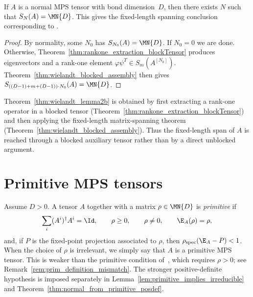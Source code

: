 \begin{theorem}\label{thm:wielandt_lemma2b}
    \leanok
    If $A$ is a normal MPS tensor with bond dimension~$D$,
    then there exists $N$ such that $S_N(A) = \MN{D}$.
    This gives the fixed-length spanning conclusion corresponding to
    \cite[Lemma~2(b)]{Sanz2010Quantum}.
\end{theorem}

\begin{proof}
    \leanok
    By normality, some $N_0$ has $S_{N_0}(A) = \MN{D}$.
    If $N_0 = 0$ we are done.
    Otherwise, Theorem~\ref{thm:rankone_extraction_blockTensor}
    produces eigenvectors and a rank-one element
    $\varphi \psi^T \in S_m(A^{[N_0]})$.
    Theorem~\ref{thm:wielandt_blocked_assembly} then gives
    $S_{((D-1) + m + (D-1)) \cdot N_0}(A) = \MN{D}$.
\end{proof}

\begin{remark}%
    \label{rem:blocked_lemma2b_gap}\leanok
    Theorem~\ref{thm:wielandt_lemma2b} is obtained by first extracting a
    rank-one operator in a blocked tensor
    (Theorem~\ref{thm:rankone_extraction_blockTensor}) and then
    applying the fixed-length matrix-spanning theorem
    (Theorem~\ref{thm:wielandt_blocked_assembly}).
    Thus the fixed-length span of $A$ is reached through a blocked
    auxiliary tensor rather than by a direct unblocked argument.
\end{remark}

\section{Primitive MPS tensors}

\begin{definition}\label{def:primitive_mps}
    \leanok
    Assume $D > 0$.
    A tensor $A$ together with a matrix $\rho \in \MN{D}$ is
    \emph{primitive} if
    \[
        \sum_i (A^i)^\dagger A^i = \Id,
        \qquad \rho \ge 0,
        \qquad \rho \neq 0,
        \qquad \E_A(\rho) = \rho,
    \]
    and, if $P$ is the fixed-point projection associated to $\rho$,
    then $\rho_{\mathrm{spec}}(\E_A - P) < 1$.
    When the choice of $\rho$ is irrelevant, we simply say that $A$
    is a primitive MPS tensor.
    This is weaker than the primitive condition of~\cite{Sanz2010Quantum}, which requires
    $\rho > 0$; see Remark~\ref{rem:prim_definition_mismatch}.
    The stronger positive-definite hypothesis is imposed separately in
    Lemma~\ref{lem:primitive_implies_irreducible}
    and Theorem~\ref{thm:normal_from_primitive_posdef}.
\end{definition}

